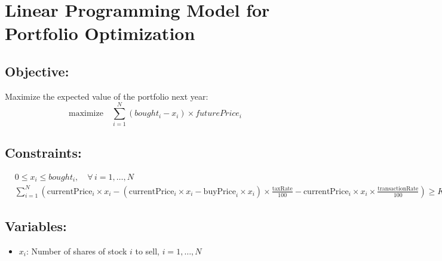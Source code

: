 \documentclass{article}
\begin{document}
\section*{Linear Programming Model for Portfolio Optimization}

\subsection*{Objective:}
Maximize the expected value of the portfolio next year:
\[
\text{maximize} \quad \sum_{i=1}^{N} \left(bought_i - x_i\right) \times futurePrice_i
\]

\subsection*{Constraints:}

\begin{align*}
& 0 \leq x_i \leq bought_i, \quad \forall \, i = 1, \ldots, N \\
& \sum_{i=1}^{N} \left( \text{currentPrice}_i \times x_i - \left(\text{currentPrice}_i \times x_i - \text{buyPrice}_i \times x_i\right) \times \frac{\text{taxRate}}{100} - \text{currentPrice}_i \times x_i \times \frac{\text{transactionRate}}{100} \right) \geq K
\end{align*}

\subsection*{Variables:}
\begin{itemize}
    \item \( x_i \): Number of shares of stock \(i\) to sell, \(i = 1, \ldots, N\)
\end{itemize}
\end{document}
